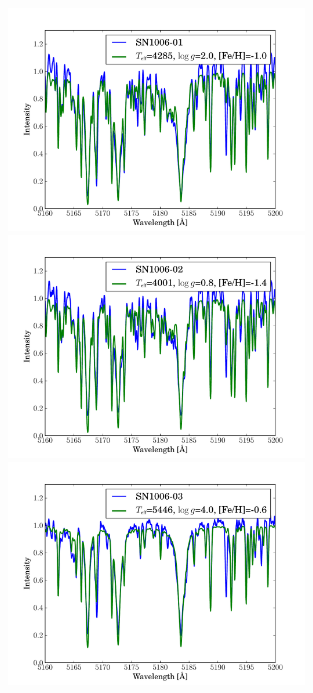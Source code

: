 \begin{figure}[htbp] %
   \centering
\includegraphics[width=0.7\textwidth, trim=0 0mm 0 10mm, clip]{chapter_sn1006/plots/gold_spectra/sn1006_01.pdf}
\includegraphics[width=0.7\textwidth, trim=0 0mm 0 10mm, clip]{chapter_sn1006/plots/gold_spectra/sn1006_02.pdf}
\includegraphics[width=0.7\textwidth, trim=0 0mm 0 10mm, clip]{chapter_sn1006/plots/gold_spectra/sn1006_03.pdf}


\end{figure}
